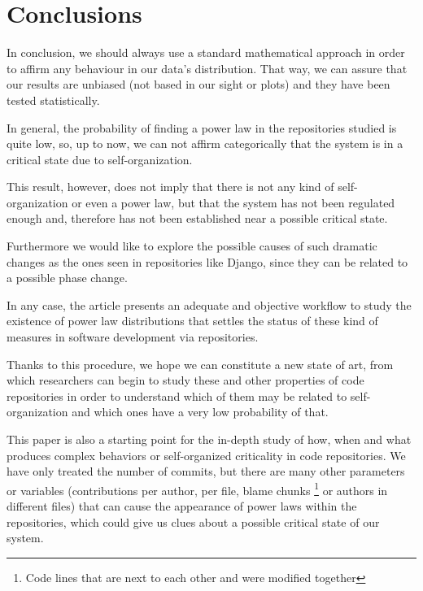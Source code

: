 \documentclass[conference]{IEEEtran}
\begin{document}


\section{Conclusions}\label{conc}



In conclusion, we should always use a standard mathematical approach in order to affirm any behaviour in our data's distribution. That way, we can assure that our results are unbiased (not based in our sight or plots) and they have been tested statistically. %

In general, the probability of finding a power law  in the repositories studied is quite low, so, up to now, we can not affirm categorically that the system is in a critical state due to self-organization.

This result, however, does not imply that there is not any kind of self-organization or even a power law, but that the system has not been regulated enough and, therefore has not been established near a possible critical state.



Furthermore we would like to explore the possible causes of such dramatic changes as the ones seen in repositories like Django, since they can be related to a possible phase change.

In any case, the article presents an adequate and objective workflow to study the existence of power law distributions that settles the status of these kind of measures in software development via repositories.

Thanks to this procedure, we hope we can constitute a new state of art, from which researchers can begin to study these and other properties of code repositories in order to understand which of them may be related to self-organization and which ones have a very low probability of that.  

This paper is also a starting point for the in-depth study of how,
when and what produces complex behaviors or self-organized criticality in code repositories. We have only treated the number of commits, but there are many other parameters or variables (contributions per author, per file, blame chunks \footnote{Code lines that are next to each other and were modified together} or authors in different files)
that can cause the appearance of power laws within the repositories, which could give us clues about a possible critical state of our system.
\end{document}
